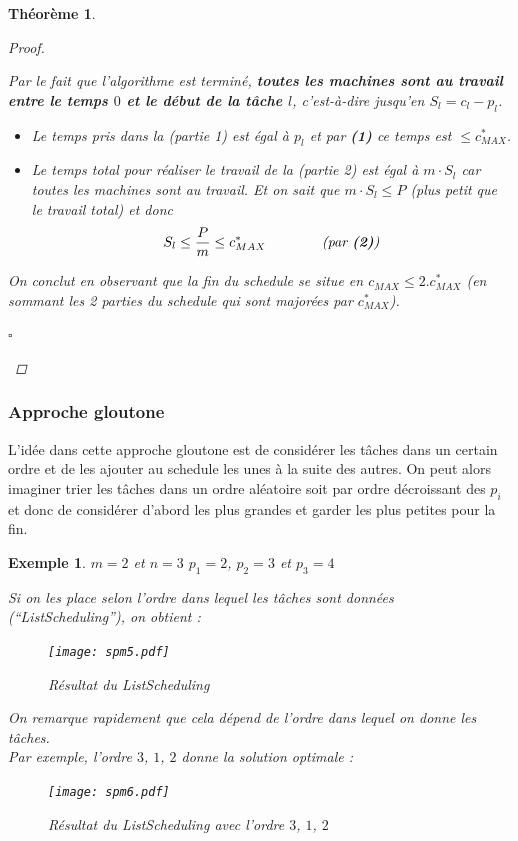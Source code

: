 \documentclass[12pt]{article}
\newcommand{\cqfd}{\begin{flushright}$\square$\end{flushright}}
\newtheorem{exemple}{Exemple}[section]
\newtheorem{thm}{Th\'eor\`eme}[section]
\newtheorem{proof}{Preuve}[section]
\begin{document}
\begin{thm}
\begin{proof}
\begin{enumerate}
Par le fait que l'algorithme est terminé, \textbf{toutes les machines sont au travail entre le temps $0$ et le début de la tâche $l$},
c'est-à-dire jusqu'en $S_l = c_l-p_l$.

\begin{itemize}
\item Le temps pris dans la \textit{(partie 1)} est égal à $p_l$ et par \textbf{(1)} ce temps est $\leq c^*_{MAX}$.
\item Le temps total pour réaliser le travail de la \textit{(partie 2)} est égal à $m \cdot S_l$ car toutes les machines sont au travail. Et on sait que $m \cdot S_l \leq
P$ \textit{(plus petit que le travail total)} et donc $$S_l \leq \frac{P}{m} \leq c^*_{MAX} \qquad\qquad \text{\textit{(par
\textbf{(2)})}}$$
\end{itemize}
On conclut en observant que la fin du schedule se situe en $c_{MAX} \leq 2.c^*_{MAX}$ (en sommant les 2 parties du schedule qui sont
majorées par $c^*_{MAX}$).
\end{enumerate}
\cqfd
\end{proof}
\end{thm}

\subsubsection{Approche gloutone}

L'idée dans cette approche gloutone est de considérer les tâches dans un certain ordre et de les ajouter au schedule les unes à la suite
des autres. On peut alors imaginer trier les tâches dans un ordre aléatoire soit par ordre décroissant des $p_i$ et donc de considérer
d'abord les plus grandes et garder les plus petites pour la fin.

\begin{exemple}$m=2$ et $n=3$
$p_1 = 2$, $p_2 = 3$ et $p_3=4$

Si on les place selon l'ordre dans lequel les tâches sont données \textit{(``ListScheduling'')}, on obtient :

\begin{figure}[H]
    \begin{center}
    \texttt{[image: spm5.pdf]}
    \caption{Résultat du ListScheduling}
    \end{center}
\end{figure}

On remarque rapidement que cela dépend de l'ordre dans lequel on donne les tâches.  \\ Par exemple, l'ordre $3$, $1$, $2$ donne la solution
optimale :

\begin{figure}[H]
    \begin{center}
    \texttt{[image: spm6.pdf]}
    \caption{Résultat du ListScheduling avec l'ordre $3$, $1$, $2$}
    \end{center}
\end{figure}

\end{exemple}
\end{document}
